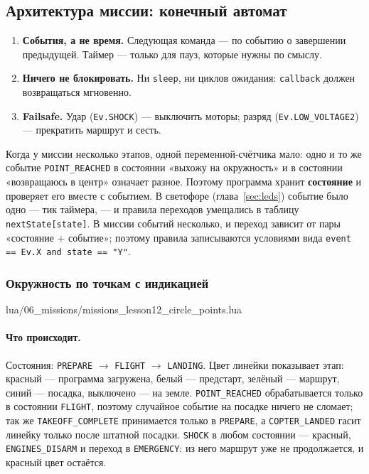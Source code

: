 \subsection{Архитектура миссии: конечный автомат}
\label{sec:missions-architecture}

\begin{infobox}
\begin{enumerate}
    \item \textbf{События, а не время.} Следующая команда --- по событию о завершении предыдущей. Таймер --- только для пауз, которые нужны по смыслу.
    \item \textbf{Ничего не блокировать.} Ни \verb|sleep|, ни циклов ожидания: \verb|callback| должен возвращаться мгновенно.
    \item \textbf{Failsafe.} Удар (\verb|Ev.SHOCK|) --- выключить моторы; разряд (\verb|Ev.LOW_VOLTAGE2|) --- прекратить маршрут и сесть.
\end{enumerate}
\end{infobox}

Когда у миссии несколько этапов, одной переменной-счётчика мало: одно и то же событие \verb|POINT_REACHED| в состоянии «выхожу на окружность» и в состоянии «возвращаюсь в центр» означает разное. Поэтому программа хранит \textbf{состояние} и проверяет его вместе с событием. В светофоре (глава~\ref{sec:leds}) событие было одно --- тик таймера, --- и правила переходов умещались в таблицу \verb|nextState[state]|. В миссии событий несколько, и переход зависит от пары «состояние + событие»; поэтому правила записываются условиями вида \verb|event == Ev.X and state == "Y"|.

\subsubsection*{Окружность по точкам с индикацией}

\begin{codefile}{lua/06_missions/missions_lesson12_circle_points.lua}
\end{codefile}

\paragraph{Что происходит.} Состояния: \verb|PREPARE| $\to$ \verb|FLIGHT| $\to$ \verb|LANDING|. Цвет линейки показывает этап: красный --- программа загружена, белый --- предстарт, зелёный --- маршрут, синий --- посадка, выключено --- на земле. \verb|POINT_REACHED| обрабатывается только в состоянии \verb|FLIGHT|, поэтому случайное событие на посадке ничего не сломает; так же \verb|TAKEOFF_COMPLETE| принимается только в \verb|PREPARE|, а \verb|COPTER_LANDED| гасит линейку только после штатной посадки. \verb|SHOCK| в любом состоянии --- красный, \verb|ENGINES_DISARM| и переход в \verb|EMERGENCY|: из него маршрут уже не продолжается, и красный цвет остаётся.

